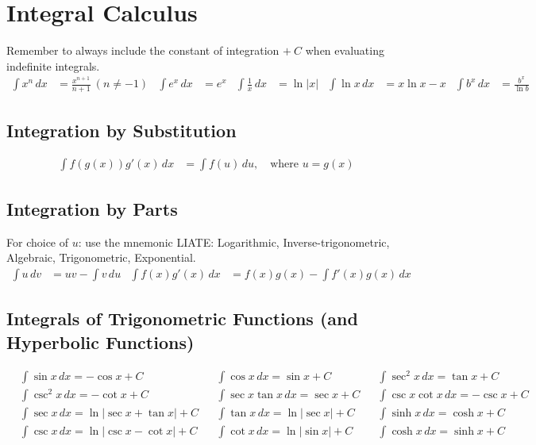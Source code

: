 \section{Integral Calculus}
Remember to always include the constant of integration \(+\ C\) when evaluating indefinite integrals.
\begin{align*}
    \int x^n \, dx      &= \frac{x^{n+1}}{n+1} \ (n \neq -1 )&
    \int e^x \, dx      &= e^x &
    \int \frac{1}{x} \, dx &= \ln |x| &
    \int \ln x \, dx    &= x \ln x - x &
    \int b^x \, dx      &= \frac{b^x}{\ln b}
\end{align*}

\subsection{Integration by Substitution}
\begin{align*}
    \int f(g(x))g'(x)\, dx &= \int f(u)\, du, \quad \text{where } u = g(x)
\end{align*}

\subsection{Integration by Parts}
For choice of \( u \): use the mnemonic LIATE: Logarithmic, Inverse-trigonometric, Algebraic, Trigonometric, Exponential.
\begin{align*}
    \int u \, dv &= uv - \int v \, du & \int f(x) g'(x) \, dx &= f(x) g(x) - \int f'(x) g(x) \, dx
\end{align*}


\subsection{Integrals of Trigonometric Functions (and Hyperbolic Functions)}
\begin{align*}
    &\int \sin x \, dx = -\cos x + C &&
    \int \cos x \, dx = \sin x + C &&
    \int \sec^2 x \, dx = \tan x + C \\
    &\int \csc^2 x \, dx = -\cot x + C &&
    \int \sec x \tan x \, dx = \sec x + C &&
    \int \csc x \cot x \, dx = -\csc x + C \\
    &\int \sec x \, dx = \ln |\sec x + \tan x | + C &&
    \int \tan x \, dx = \ln |\sec x | + C  &&
    \int \sinh x \, dx = \cosh x + C \\
    &\int \csc x \, dx = \ln |\csc x - \cot x | + C &&
    \int \cot x \, dx = \ln |\sin x | + C &&
    \int \cosh x \, dx = \sinh x + C
\end{align*}

